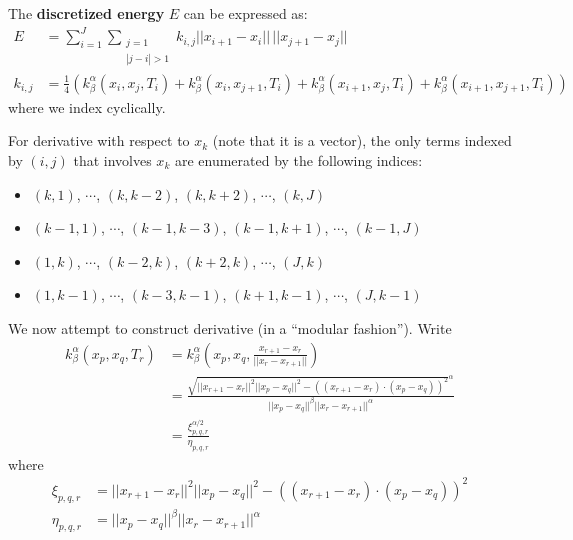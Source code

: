 \documentclass[a4paper]{article}
\newcommand{\norm}[1]{||#1||}
\begin{document}
The \textbf{discretized energy} $E$ can be expressed as:
\begin{align}
    E &= \sum_{i = 1}^{J} \sum_{\substack{j = 1 \\ |j-i| > 1}} k_{i,j} \norm{x_{i+1} - x_i} \, \norm{x_{j+1} - x_j} 
    \label{equ: Discretized Energy}
    \\
    k_{i,j} &= \frac{1}{4} \left( 
        k_{\beta}^{\alpha} \left( x_i, x_j, T_i \right)
        + k_{\beta}^{\alpha} \left( x_i, x_{j+1}, T_i \right)
        + k_{\beta}^{\alpha} \left( x_{i+1}, x_j, T_i \right)
        + k_{\beta}^{\alpha} \left( x_{i+1}, x_{j+1}, T_i \right)
    \right)
\end{align}
where we index cyclically.

For derivative with respect to $x_k$ (note that it is a vector), the only terms indexed by
$(i,j)$ that involves $x_k$ are enumerated by the following indices:
\begin{itemize}
    \item $(k,1)$, $\cdots$, $(k, k-2)$, $(k, k+2)$, $\cdots$, $(k,J)$
    \item $(k-1,1)$, $\cdots$, $(k-1, k-3)$, $(k-1, k+1)$, $\cdots$, $(k-1,J)$
    \item $(1,k)$, $\cdots$, $(k-2, k)$, $(k+2, k)$, $\cdots$, $(J,k)$
    \item $(1,k-1)$, $\cdots$, $(k-3, k-1)$, $(k+1, k-1)$, $\cdots$, $(J,k-1)$
\end{itemize}

We now attempt to construct derivative (in a ``modular fashion'').
Write 
\begin{align}
    k_{\beta}^{\alpha} \left( x_p, x_q, T_r \right) &= k_{\beta}^{\alpha} \left( x_p, x_q, \frac{x_{r+1} - x_{r}}{\norm{x_{r} - x_{r+1}}} \right) \nonumber
    \\
    &= \frac{\sqrt{\norm{x_{r+1} - x_r}^2 \norm{x_p - x_q}^2- \left( \left( x_{r+1} - x_{r} \right) \cdot \left( x_{p} - x_{q} \right) \right)^2}^{\alpha} }{\norm{x_p - x_q}^{\beta} \norm{x_r - x_{r+1}}^{\alpha}} \nonumber \\
    &= \frac{\xi_{p,q,r}^{\alpha/2}}{\eta_{p,q,r}}
\end{align}
where
\begin{align}
    \xi_{p,q,r} &= \norm{x_{r+1} - x_r}^2 \norm{x_p - x_q}^2- \left( \left( x_{r+1} - x_{r} \right) \cdot \left( x_{p} - x_{q} \right) \right)^2 \\
    \eta_{p,q,r} &= \norm{x_p - x_q}^{\beta} \norm{x_r - x_{r+1}}^{\alpha}
\end{align}
\end{document}
